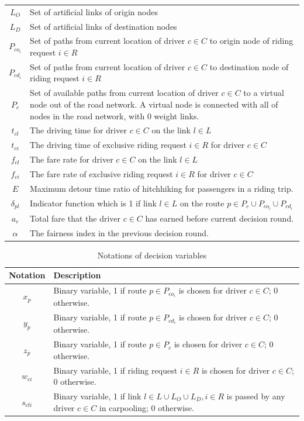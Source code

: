 \begin{longtable}{cp{14cm}}
    $L_{O}$ & Set of artificial links of origin nodes \\
    $L_{D}$ & Set of artificial links of destination nodes \\
    $P_{co_i}$ & Set of paths from current location of driver $c \in C$ to origin node of riding request $i \in R$ \\
    $P_{cd_i}$ & Set of paths from current location of driver $c \in C$ to destination node of riding request $i \in R$ \\
    $P_c$ & Set of available paths from current location of driver $c \in C$ to a virtual node out of the road network. A virtual node is connected with all of nodes in the road network, with 0 weight links. \\
    $t_{cl}$ & The driving time for driver $c \in C$ on the link $l \in L$ \\
    $t_{ci}$ & The driving time of exclusive riding request $i \in R$ for driver $c \in C$ \\
    $f_{cl}$ & The fare rate for driver $c \in C$ on the link $l \in L$ \\
    $f_{ci}$ & The fare rate of exclusive riding request $i \in R$ for driver $c \in C$ \\
    $E$ & Maximum detour time ratio of hitchhiking for passengers in a riding trip. \\
    $\delta_{pl}$ & Indicator function which is 1 if link $l \in L$ on the route $p \in P_c \cup P_{co_i} \cup P_{cd_i}$ \\
    $a_c$ & Total fare that the driver $c \in C$ has earned before current decision round. \\
    $\alpha$ & The fairness index in the previous decision round. \\
  \bottomrule
\end{longtable}  
\par

\begin{longtable}{cp{14cm}}
  \caption{Notations of decision variables}\\
  \toprule
  \multicolumn{1}{l}{Notation}&
  \multicolumn{1}{l}{Description}\\
  \midrule
  \endhead
    $x_{p}$ & Binary variable, 1 if route $p \in P_{co_i}$ is chosen for driver $c \in C$; 0 otherwise. \\
    $y_{p}$ & Binary variable, 1 if route $p \in P_{cd_i}$ is chosen for driver $c \in C$; 0 otherwise. \\
    $z_{p}$ & Binary variable, 1 if route $p \in P_c$ is chosen for driver $c \in C$; 0 otherwise. \\
    $w_{ci}$ & Binary variable, 1 if riding request $i \in R$ is chosen for driver $c \in C$; 0 otherwise. \\
    $s_{cli}$ & Binary variable, 1 if link $l \in L \cup L_O \cup L_D, i \in R$ is passed by any driver $c \in C$ in carpooling; 0 otherwise. \\
  \bottomrule
\end{longtable}  
\newpage

